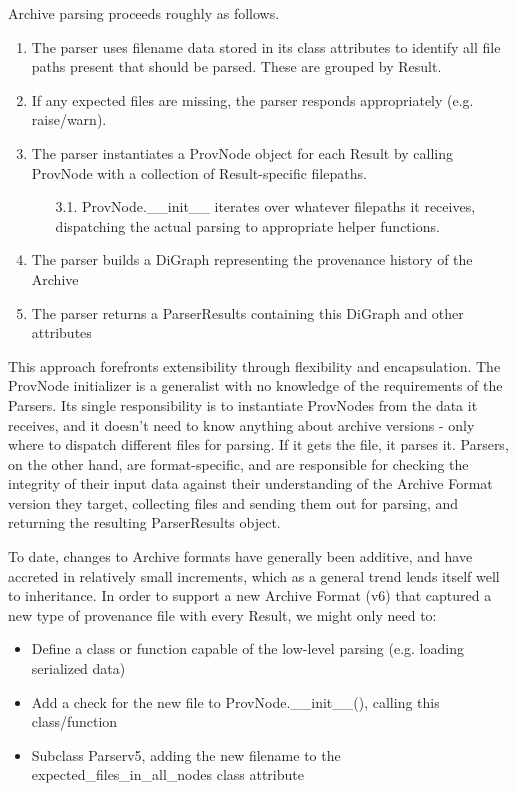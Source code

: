 Archive parsing proceeds roughly as follows.
\begin{enumerate}
    \item The parser uses filename data stored in its class attributes to identify all file paths present that should be parsed. These are grouped by Result.
    \item If any expected files are missing, the parser responds appropriately (e.g. raise/warn).
    \item The parser instantiates a ProvNode object for each Result by calling ProvNode with a collection of Result-specific filepaths.
    \begin{enumerate}
        \item[3.1.]ProvNode.\_\_init\_\_ iterates over whatever filepaths it receives, dispatching the actual parsing to appropriate helper functions. 
    \end{enumerate}
    \item The parser builds a DiGraph representing the provenance history of the Archive
    \item The parser returns a ParserResults containing this DiGraph and other attributes
\end{enumerate}

This approach forefronts extensibility through flexibility and encapsulation.
The ProvNode initializer is a generalist with no knowledge of the requirements
of the Parsers. Its single responsibility is to instantiate ProvNodes from the
data it receives, and it doesn’t need to know anything about archive versions -
only where to dispatch different files for parsing. If it gets the file, it
parses it. Parsers, on the other hand, are format-specific, and are responsible
for checking the integrity of their input data against their understanding of
the Archive Format version they target, collecting files and sending them out
for parsing, and returning the resulting ParserResults object.

To date, changes to Archive formats have generally been additive, and have
accreted in relatively small increments, which as a general trend lends itself
well to inheritance. In order to support a new Archive Format (v6) that captured
a new type of provenance file with every Result, we might only need to:
\begin{itemize}
    \item Define a class or function capable of the low-level parsing (e.g. loading serialized data)
    \item Add a check for the new file to ProvNode.\_\_init\_\_(), calling this class/function
    \item Subclass Parserv5, adding the new filename to the expected\_files\_in\_all\_nodes class attribute
\end{itemize}

